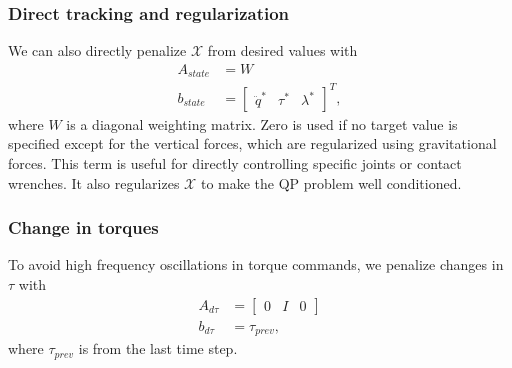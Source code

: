 \documentclass{ws-ijhr}
\newcommand{\tref}[1] {Table \ref{#1}}
\newcommand{\QPx}{\mathcal{X}}
\begin{document}
\subsubsection{Direct tracking and regularization} 
We can also directly penalize $\QPx$ from desired values with
\begin{equation}
  \begin{split}
    A_{state} &= W \\
    b_{state} &= \begin{bmatrix} \ddot{q}^* & \tau^* & \lambda^* \end{bmatrix}^T,
  \end{split}
	\label{eq:id_reg}
\end{equation}
where $W$ is a diagonal weighting matrix. 
Zero is used if no target value is specified except for the vertical forces, which 
are regularized using gravitational forces. This term is useful for directly 
controlling specific joints or contact wrenches. It also regularizes $\QPx$ to make the
QP problem well conditioned.

\subsubsection{Change in torques} 
To avoid high frequency oscillations in torque commands, we penalize changes in 
$\tau$ with
\begin{equation}
  \begin{split}
    A_{d\tau} &= \begin{bmatrix} 0 & I & 0 \end{bmatrix} \\
    b_{d\tau} &= \tau_{prev},
  \end{split}
\end{equation} 
where $\tau_{prev}$ is from the last time step.

\end{document}
